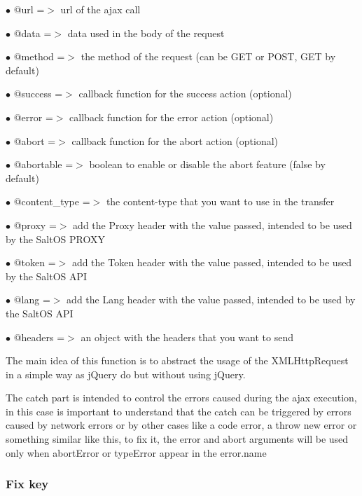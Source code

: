 \documentclass[a4paper]{article}
\begin{document}
\begin{compactitem}
\item[\color{myblue}$\bullet$] @url          =$>$ url of the ajax call
\item[\color{myblue}$\bullet$] @data         =$>$ data used in the body of the request
\item[\color{myblue}$\bullet$] @method       =$>$ the method of the request (can be GET or POST, GET by default)
\item[\color{myblue}$\bullet$] @success      =$>$ callback function for the success action (optional)
\item[\color{myblue}$\bullet$] @error        =$>$ callback function for the error action (optional)
\item[\color{myblue}$\bullet$] @abort        =$>$ callback function for the abort action (optional)
\item[\color{myblue}$\bullet$] @abortable    =$>$ boolean to enable or disable the abort feature (false by default)
\item[\color{myblue}$\bullet$] @content\_type =$>$ the content-type that you want to use in the transfer
\item[\color{myblue}$\bullet$] @proxy        =$>$ add the Proxy header with the value passed, intended to be used by the SaltOS PROXY
\item[\color{myblue}$\bullet$] @token        =$>$ add the Token header with the value passed, intended to be used by the SaltOS API
\item[\color{myblue}$\bullet$] @lang         =$>$ add the Lang header with the value passed, intended to be used by the SaltOS API
\item[\color{myblue}$\bullet$] @headers      =$>$ an object with the headers that you want to send
\end{compactitem}

The main idea of this function is to abstract the usage of the XMLHttpRequest in a simple
way as jQuery do but without using jQuery.

The catch part is intended to control the errors caused during the ajax execution,
in this case is important to understand that the catch can be triggered by errors
caused by network errors or by other cases like a code error, a throw new error or
something similar like this, to fix it, the error and abort arguments will be used
only when abortError or typeError appear in the error.name

\hypertarget{toc146}{}
\subsubsection{Fix key}
\end{document}

